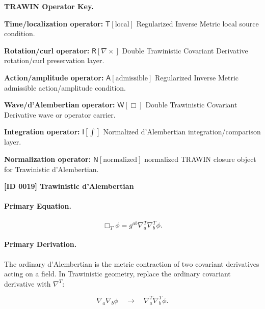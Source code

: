 \par\vspace{0.45\baselineskip}
\noindent\begin{minipage}[t]{\linewidth}
\begingroup
\small
\raggedright
\textbf{TRAWIN Operator Key.}\par
\noindent\textbf{Time/localization operator:} $\mathsf{T}\!\left[\mathrm{local}\right]$ Regularized Inverse Metric local source condition.\par
\noindent\textbf{Rotation/curl operator:} $\mathsf{R}\!\left[\nabla\times\right]$ Double Trawinistic Covariant Derivative rotation/curl preservation layer.\par
\noindent\textbf{Action/amplitude operator:} $\mathsf{A}\!\left[\mathrm{admissible}\right]$ Regularized Inverse Metric admissible action/amplitude condition.\par
\noindent\textbf{Wave/d'Alembertian operator:} $\mathsf{W}\!\left[\Box\right]$ Double Trawinistic Covariant Derivative wave or operator carrier.\par
\noindent\textbf{Integration operator:} $\mathsf{I}\!\left[\int\right]$ Normalized d'Alembertian integration/comparison layer.\par
\noindent\textbf{Normalization operator:} $\mathsf{N}\!\left[\mathrm{normalized}\right]$ normalized TRAWIN closure object for Trawinistic d'Alembertian.\par
\endgroup
\end{minipage}

\clearpage
\noindent\textbf{[ID 0019] Trawinistic d'Alembertian}\par
\vspace{0.35em}
\paragraph{Primary Equation.}
\begin{equation}
\Box_T\phi
=
g^{ab}
\nabla^{T}_{a}
\nabla^{T}_{b}
\phi .
\end{equation}

\paragraph{Primary Derivation.}
The ordinary d'Alembertian is the metric contraction of two covariant derivatives acting on a field.  
In Trawinistic geometry, replace the ordinary covariant derivative with $\nabla^T$:

\begin{equation}
\nabla_a\nabla_b\phi
\quad\longrightarrow\quad
\nabla^T_a\nabla^T_b\phi .
\end{equation}

